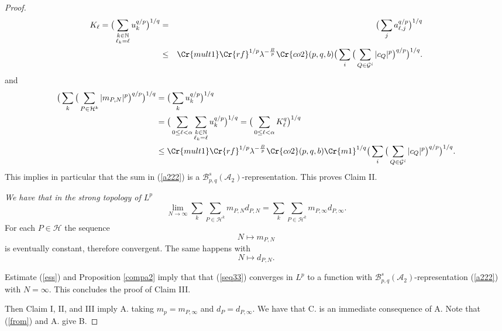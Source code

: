 \documentclass{amsart}
\theoremstyle{definition}
\newcommand{\Crr}[1]{\Cr{#1}}
\begin{document}
\begin{proof}
\begin{eqnarray*} K_\ell= \big(\sum_{\substack{k\in \mathbb{N} \\ \ell_k=\ell}}  u_{k}^{q/p}\big)^{1/q} &=&\big(\sum_{j} a_{\ell,j}^{q/p}\big)^{1/q}\\
&\leq&  \Crr{mult1}  \Crr{rf}^{1/p}\lambda^{-\frac{B}{p}} \Crr{co2}(p,q,b) \big( \sum_i  \big( \sum_{Q\in \mathcal{G}^i}  |c_{Q}|^p  \big)^{q/p}\big)^{1/q}.
\end{eqnarray*} 
and
\begin{align} \label{bbbb} \big(\sum_k \big( \sum_{ P\in \mathcal{H}^k} |m_{P,N}|^p \big)^{q/p}\big)^{1/q}&=  \big(\sum_k u_k^{q/p}\big)^{1/q}  \nonumber \\
&=  \big(\sum_{0\leq \ell < \alpha} \sum_{\substack{k\in \mathbb{N} \\ \ell_k=\ell}}  u_{k}^{q/p}\big)^{1/q}=  \big(\sum_{0\leq \ell < \alpha}K_\ell^q \big)^{1/q}\nonumber \\
 &\leq \Crr{mult1}  \Crr{rf}^{1/p}\lambda^{-\frac{B}{p}} \Crr{co2}(p,q,b) \Crr{m1}^{1/q}  \big( \sum_i  \big( \sum_{Q\in \mathcal{G}^i}  |c_{Q}|^p  \big)^{q/p}\big)^{1/q}.
\end{align}
This implies in particular that the sum  in (\ref{a222}) is a $\mathcal{B}^s_{p,q}(\mathcal{A}_2)$-representation. This proves Claim II.  
 \vspace{5mm}
  
   {\it We have that in the strong topology of  $L^p$
$$\lim_{N\rightarrow \infty}  \sum_k \sum_{P\in \mathcal{H}^k} m_{P,N}  d_{P,N} =\sum_k \sum_{P\in \mathcal{H}^k} m_{P,\infty}  d_{P,\infty}.   $$}
For each $P\in \mathcal{H}$ the sequence
\begin{equation}\label{seqdf} N\mapsto m_{P,N}\end{equation} 
is eventually constant, therefore convergent. The same happens with 
\begin{equation}\label{seqdf2} N\mapsto d_{P,N}.\end{equation}


\noindent Estimate (\ref{ess}) and Proposition \ref{compa2} imply that  that (\ref{seq33}) converges in $L^p$ to a function    with $\mathcal{B}^s_{p,q}(\mathcal{A}_2)$-representation  (\ref{a222}) with $N=\infty$. This concludes the proof of Claim III. 

Then Claim I, II, and III imply A. taking $m_p=m_{P,\infty}$ and $d_P=d_{P,\infty}.$ We have that  C. is an immediate consequence of A.  Note that (\ref{from}) and A. give B.
\end{proof}
\vspace{1cm}
\end{document}
